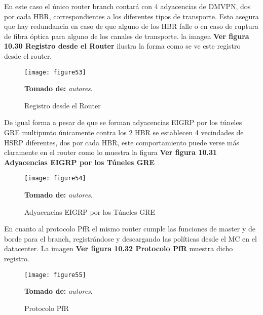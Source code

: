 En este caso el único router branch contará con 4 adyacencias de DMVPN, dos por cada HBR, correspondientes a los diferentes tipos de transporte. Esto asegura que hay redundancia en caso de que alguno de los HBR falle o en caso de ruptura de fibra óptica para alguno de los canales de transporte. la imagen \textbf{Ver figura 10.30 Registro desde el Router} ilustra la forma como se ve este registro desde el router.

\begin{figure}[htbp]
  \centering
    {\texttt{[image: figure53]}}%
  \caption{ \footnotesize{ Registro desde el Router}}
  \footnotesize{\textbf{Tomado de:} \textit{autores}.}
  \label{fig:fig2subfig}
\end{figure}

De igual forma a pesar de que se forman adyacencias EIGRP por los túneles GRE multipunto únicamente contra los 2 HBR se establecen 4 vecindades de HSRP diferentes, dos por cada HBR, este comportamiento puede verse más claramente en el router como lo muestra la figura \textbf{Ver figura 10.31 Adyacencias EIGRP por los Túneles GRE}

\begin{figure}[htbp]
  \centering
    {\texttt{[image: figure54]}}%
  \caption{ \footnotesize{ Adyacencias EIGRP por los Túneles GRE}}
  \footnotesize{\textbf{Tomado de:} \textit{autores}.}
  \label{fig:fig2subfig}
\end{figure}

En cuanto al protocolo PfR el mismo router cumple las funciones de master y de borde para el branch, registrándose y descargando las políticas desde el MC en el datacenter. La imagen \textbf{Ver figura 10.32  Protocolo PfR} muestra dicho registro.

\begin{figure}[htbp]
  \centering
    {\texttt{[image: figure55]}}%
  \caption{ \footnotesize{ Protocolo PfR}}
  \textbf{Tomado de:} \textit{autores}.
  \label{fig:fig2subfig}
\end{figure}
